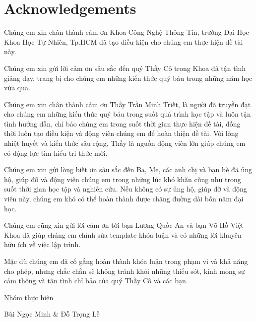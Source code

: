 \chapter{Acknowledgements}
Chúng em xin chân thành cảm ơn Khoa Công Nghệ Thông Tin, trường Đại Học Khoa Học Tự Nhiên, Tp.HCM đã tạo điều kiện  cho chúng em thực hiện đề tài này.

Chúng em xin gửi lời cảm ơn sâu sắc đến quý Thầy Cô trong Khoa đã tận tình giảng dạy, trang bị cho chúng em những kiến thức quý báu trong những năm học vừa qua.

Chúng em xin chân thành cảm ơn Thầy Trần Minh Triết, là người đã truyền đạt cho chúng em những kiến thức quý báu trong suốt quá trình học tập và luôn tận tình hướng dẫn, chỉ bảo chúng em trong suốt thời gian thực hiện đề tài, đồng thời luôn tạo điều kiện và động viên chúng em để hoàn thiện đề tài. Với lòng nhiệt huyết và kiến thức sâu rộng, Thầy là nguồn động viên lớn giúp chúng em có động lực tìm hiểu tri thức mới.

Chúng em xin gửi lòng biết ơn sâu sắc đến Ba, Mẹ, các anh chị và bạn bè đã ủng hộ, giúp đỡ và động viên chúng em trong những lúc khó khăn cũng như trong suốt thời gian học tập và nghiên cứu. Nếu không có sự ủng hộ, giúp đỡ và động viên này, chúng em khó có thể hoàn thành được chặng đuờng dài bốn năm đại học.

Chúng em cũng xin gửi lời cảm ơn tới bạn Lương Quốc An và bạn Võ Hồ Việt Khoa đã giúp chúng em chỉnh sửa template khóa luận và có những lời khuyên hữu ích về việc lập trình.

Mặc dù chúng em đã cố gắng hoàn thành khóa luận trong phạm vi và khả năng cho phép, nhưng chắc chắn sẽ không tránh khỏi những thiếu sót, kính mong sự cảm thông và tận tình chỉ bảo của quý Thầy Cô và các bạn.

\begin{flushright}
\begin{minipage}{8cm}
\centering
Nhóm thực hiện

Bùi Ngọc Minh \& Đỗ Trọng Lễ
\end{minipage}
\end{flushright}